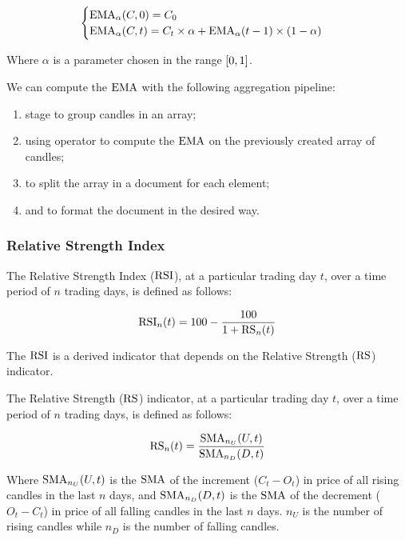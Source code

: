 \begin{equation}\label{eq:ema}
	\begin{cases}
		\operatorname{EMA}_{\alpha}(C,0) = C_0\\
		\operatorname{EMA}_{\alpha}(C,t) = C_t\times\alpha +
		\operatorname{EMA}_{\alpha}(t-1)\times(1-\alpha)
	\end{cases}
\end{equation}

Where \(\alpha\) is a parameter chosen in the range \(\interval{0}{1}\).

We can compute the \(\operatorname{EMA}\) with the following aggregation pipeline:

\begin{enumerate}
	\item {} stage to group candles in an array;
	\item {} using  operator to compute the
		\(\operatorname{EMA}\) on the previously created array of candles;
	\item {} to split the array in a document for each element;
	\item {} and  to format the document
		in the desired way.
\end{enumerate}

\subsubsection{Relative Strength Index}

The Relative Strength Index (\(\operatorname{RSI}\)), at a particular trading day \(t\), over
a time period of \(n\) trading days, is defined as follows:

\begin{equation}\label{eq:rsi}
	\operatorname{RSI}_n(t) = 100 - \frac{100}{1 + \operatorname{RS}_n(t)}
\end{equation}

The \(\operatorname{RSI}\) is a derived indicator that depends on the Relative Strength
(\(\operatorname{RS}\)) indicator.

The Relative Strength (\(\operatorname{RS}\)) indicator, at a particular trading day \(t\),
over a time period of \(n\) trading days, is defined as follows:

\begin{equation}\label{eq:rs}
	\operatorname{RS}_n(t) = \frac{\operatorname{SMA}_{n_U}(U,t)}{\operatorname{SMA}_{n_D}(D,t)}
\end{equation}

Where \(\operatorname{SMA}_{n_U}(U,t)\) is the \(\operatorname{SMA}\) of the increment (\(C_t - O_t\)) in
price of all rising candles in the last \(n\) days, and \(\operatorname{SMA}_{n_D}(D,t)\) is
the \(\operatorname{SMA}\) of the decrement (\(O_t - C_t\)) in price of all falling candles in
the last \(n\) days. \(n_U\) is the number of rising candles while \(n_D\) is
the number of falling candles.

